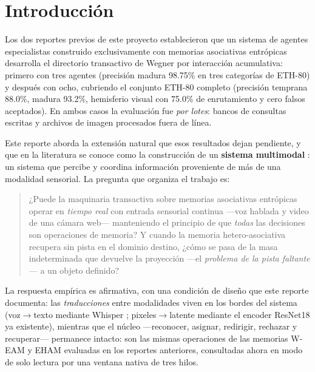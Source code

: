 \section{Introducción}
\label{sec:introduccion}

Los dos reportes previos de este proyecto establecieron que un sistema de agentes
especialistas construido exclusivamente con memorias asociativas entrópicas desarrolla
el directorio transactivo de Wegner \cite{wegner1987transactive} por interacción
acumulativa: primero con tres agentes (precisión madura 98.75\% en tres categorías de
ETH-80) y después con ocho, cubriendo el conjunto ETH-80 \cite{leibe2003eth80} completo
(precisión temprana 88.0\%, madura 93.2\%, hemisferio visual con 75.0\% de
enrutamiento y cero falsos aceptados).
En ambos casos la evaluación fue \emph{por lotes}: bancos de consultas escritas y
archivos de imagen procesados fuera de línea.

Este reporte aborda la extensión natural que esos resultados dejan pendiente, y que
en la literatura se conoce como la construcción de un \textbf{sistema multimodal}
\cite{baltrusaitis2019multimodal}: un sistema que percibe y coordina información
proveniente de más de una modalidad sensorial.
La pregunta que organiza el trabajo es:

\begin{quote}
¿Puede la maquinaria transactiva sobre memorias asociativas entrópicas operar en
\emph{tiempo real} con entrada sensorial continua ---voz hablada y video de una cámara
web--- manteniendo el principio de que \emph{todas} las decisiones son operaciones de
memoria? Y cuando la memoria hetero-asociativa recupera sin pista en el dominio
destino, ¿cómo se pasa de la masa indeterminada que devuelve la proyección
---el \emph{problema de la pista faltante} \cite{morales2025missing}--- a un objeto
definido?
\end{quote}

La respuesta empírica es afirmativa, con una condición de diseño que este reporte
documenta: las \emph{traducciones} entre modalidades viven en los bordes del sistema
(voz$\to$texto mediante Whisper \cite{radford2023whisper}; pixeles$\to$latente mediante
el encoder ResNet18 \cite{he2016resnet} ya existente), mientras que el núcleo
---reconocer, asignar, redirigir, rechazar y recuperar--- permanece intacto: son las
mismas operaciones de las memorias W-EAM y EHAM
\cite{pineda2021entropic,pineda2022weighted,morales2024hetero} evaluadas en los
reportes anteriores, consultadas ahora en modo de solo lectura por una ventana nativa
de tres hilos.

